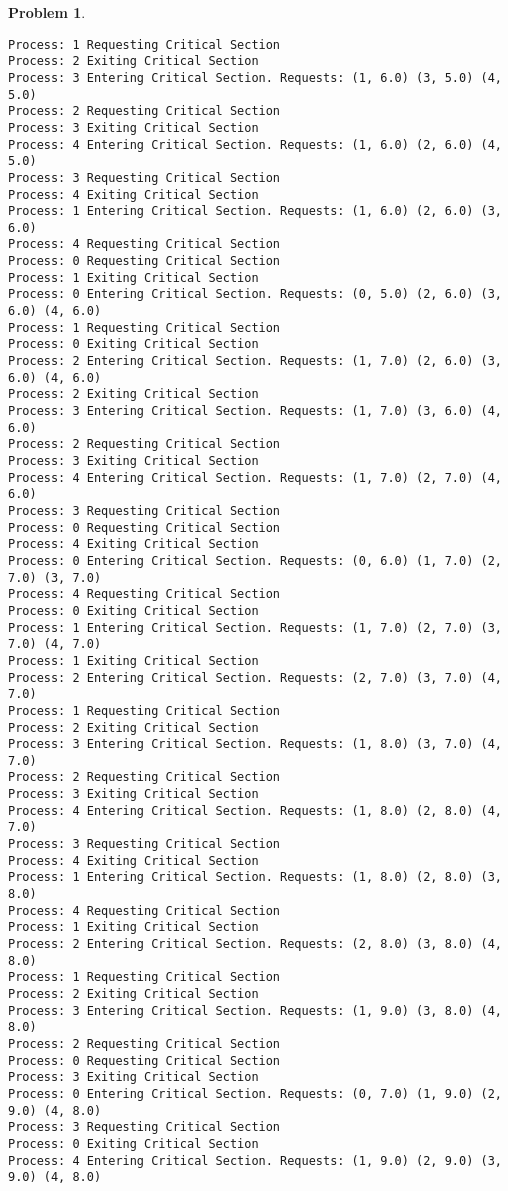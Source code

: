 \documentclass{article}
\theoremstyle{problemstyle}
\newtheorem{problem}{Problem}
\begin{document}
\begin{problem}
\begin{enumerate}[label=(\alph*)]
\begin{lstlisting}
Process: 1 Requesting Critical Section
Process: 2 Exiting Critical Section
Process: 3 Entering Critical Section. Requests: (1, 6.0) (3, 5.0) (4, 5.0)
Process: 2 Requesting Critical Section
Process: 3 Exiting Critical Section
Process: 4 Entering Critical Section. Requests: (1, 6.0) (2, 6.0) (4, 5.0)
Process: 3 Requesting Critical Section
Process: 4 Exiting Critical Section
Process: 1 Entering Critical Section. Requests: (1, 6.0) (2, 6.0) (3, 6.0)
Process: 4 Requesting Critical Section
Process: 0 Requesting Critical Section
Process: 1 Exiting Critical Section
Process: 0 Entering Critical Section. Requests: (0, 5.0) (2, 6.0) (3, 6.0) (4, 6.0)
Process: 1 Requesting Critical Section
Process: 0 Exiting Critical Section
Process: 2 Entering Critical Section. Requests: (1, 7.0) (2, 6.0) (3, 6.0) (4, 6.0)
Process: 2 Exiting Critical Section
Process: 3 Entering Critical Section. Requests: (1, 7.0) (3, 6.0) (4, 6.0)
Process: 2 Requesting Critical Section
Process: 3 Exiting Critical Section
Process: 4 Entering Critical Section. Requests: (1, 7.0) (2, 7.0) (4, 6.0)
Process: 3 Requesting Critical Section
Process: 0 Requesting Critical Section
Process: 4 Exiting Critical Section
Process: 0 Entering Critical Section. Requests: (0, 6.0) (1, 7.0) (2, 7.0) (3, 7.0)
Process: 4 Requesting Critical Section
Process: 0 Exiting Critical Section
Process: 1 Entering Critical Section. Requests: (1, 7.0) (2, 7.0) (3, 7.0) (4, 7.0)
Process: 1 Exiting Critical Section
Process: 2 Entering Critical Section. Requests: (2, 7.0) (3, 7.0) (4, 7.0)
Process: 1 Requesting Critical Section
Process: 2 Exiting Critical Section
Process: 3 Entering Critical Section. Requests: (1, 8.0) (3, 7.0) (4, 7.0)
Process: 2 Requesting Critical Section
Process: 3 Exiting Critical Section
Process: 4 Entering Critical Section. Requests: (1, 8.0) (2, 8.0) (4, 7.0)
Process: 3 Requesting Critical Section
Process: 4 Exiting Critical Section
Process: 1 Entering Critical Section. Requests: (1, 8.0) (2, 8.0) (3, 8.0)
Process: 4 Requesting Critical Section
Process: 1 Exiting Critical Section
Process: 2 Entering Critical Section. Requests: (2, 8.0) (3, 8.0) (4, 8.0)
Process: 1 Requesting Critical Section
Process: 2 Exiting Critical Section
Process: 3 Entering Critical Section. Requests: (1, 9.0) (3, 8.0) (4, 8.0)
Process: 2 Requesting Critical Section
Process: 0 Requesting Critical Section
Process: 3 Exiting Critical Section
Process: 0 Entering Critical Section. Requests: (0, 7.0) (1, 9.0) (2, 9.0) (4, 8.0)
Process: 3 Requesting Critical Section
Process: 0 Exiting Critical Section
Process: 4 Entering Critical Section. Requests: (1, 9.0) (2, 9.0) (3, 9.0) (4, 8.0)

\end{lstlisting}
\end{enumerate}
\end{problem}
\end{document}
